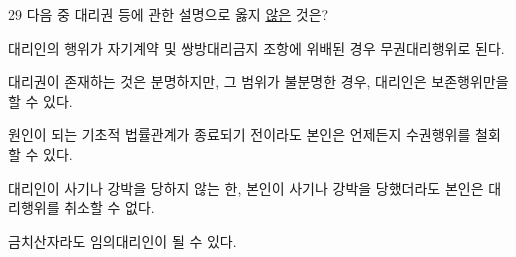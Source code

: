 \begin{question}{29}
다음 중 대리권 등에 관한 설명으로 옳지 \uline{않은} 것은?
\begin{choices}
  \item 대리인의 행위가 자기계약 및 쌍방대리금지 조항에 위배된 경우 무권대리행위로 된다.
  \item 대리권이 존재하는 것은 분명하지만, 그 범위가 불분명한 경우, 대리인은 보존행위만을 할 수 있다.
  \item 원인이 되는 기초적 법률관계가 종료되기 전이라도 본인은 언제든지 수권행위를 철회할 수 있다.
  \item 대리인이 사기나 강박을 당하지 않는 한, 본인이 사기나 강박을 당했더라도 본인은 대리행위를 취소할 수 없다.
  \item 금치산자라도 임의대리인이 될 수 있다.
\end{choices}
\end{question}
